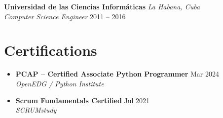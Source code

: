 \documentclass[10pt, letterpaper]{article}
\newcommand{\jobtitle}[4]{%
    \textbf{#1} \hfill \textit{#2}\\[-1pt]%
    \textit{#3} \hfill #4%
}
\begin{document}
\jobtitle{Universidad de las Ciencias Inform\'{a}ticas}{La Habana, Cuba}{Computer Science Engineer}{2011 -- 2016}

\section{Certifications}

\begin{itemize}
    \item \textbf{PCAP\texttrademark{} -- Certified Associate Python Programmer} \hfill Mar 2024\\
          \textit{OpenEDG / Python Institute}
    \item \textbf{Scrum Fundamentals Certified} \hfill Jul 2021\\
          \textit{SCRUMstudy}
\end{itemize}
\end{document}
